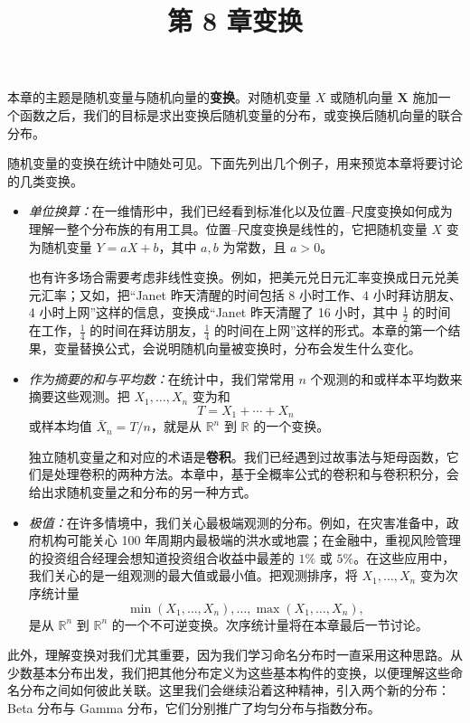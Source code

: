 \documentclass[UTF8,12pt,a4paper,fontset=fandol]{ctexart}
\title{第 8 章\quad 变换}
\author{}
\date{}
\begin{document}
\maketitle

本章的主题是随机变量与随机向量的\textbf{变换}。对随机变量 $X$ 或随机向量 $\mathbf X$ 施加一个函数之后，我们的目标是求出变换后随机变量的分布，或变换后随机向量的联合分布。

随机变量的变换在统计中随处可见。下面先列出几个例子，用来预览本章将要讨论的几类变换。

\begin{itemize}
  \item \textit{单位换算：}在一维情形中，我们已经看到标准化以及位置--尺度变换如何成为理解一整个分布族的有用工具。位置--尺度变换是线性的，它把随机变量 $X$ 变为随机变量 $Y=aX+b$，其中 $a,b$ 为常数，且 $a>0$。

  也有许多场合需要考虑非线性变换。例如，把美元兑日元汇率变换成日元兑美元汇率；又如，把“Janet 昨天清醒的时间包括 8 小时工作、4 小时拜访朋友、4 小时上网”这样的信息，变换成“Janet 昨天清醒了 16 小时，其中 $\frac12$ 的时间在工作，$\frac14$ 的时间在拜访朋友，$\frac14$ 的时间在上网”这样的形式。本章的第一个结果，变量替换公式，会说明随机向量被变换时，分布会发生什么变化。

  \item \textit{作为摘要的和与平均数：}在统计中，我们常常用 $n$ 个观测的和或样本平均数来摘要这些观测。把 $X_1,\ldots,X_n$ 变为和
  \[
    T=X_1+\cdots+X_n
  \]
  或样本均值 $\bar X_n=T/n$，就是从 $\mathbb R^n$ 到 $\mathbb R$ 的一个变换。

  独立随机变量之和对应的术语是\textbf{卷积}。我们已经遇到过故事法与矩母函数，它们是处理卷积的两种方法。本章中，基于全概率公式的卷积和与卷积积分，会给出求随机变量之和分布的另一种方式。

  \item \textit{极值：}在许多情境中，我们关心最极端观测的分布。例如，在灾害准备中，政府机构可能关心 100 年周期内最极端的洪水或地震；在金融中，重视风险管理的投资组合经理会想知道投资组合收益中最差的 $1\%$ 或 $5\%$。在这些应用中，我们关心的是一组观测的最大值或最小值。把观测排序，将 $X_1,\ldots,X_n$ 变为次序统计量
  \[
    \min(X_1,\ldots,X_n),\ldots,\max(X_1,\ldots,X_n),
  \]
  是从 $\mathbb R^n$ 到 $\mathbb R^n$ 的一个不可逆变换。次序统计量将在本章最后一节讨论。
\end{itemize}

此外，理解变换对我们尤其重要，因为我们学习命名分布时一直采用这种思路。从少数基本分布出发，我们把其他分布定义为这些基本构件的变换，以便理解这些命名分布之间如何彼此关联。这里我们会继续沿着这种精神，引入两个新的分布：Beta 分布与 Gamma 分布，它们分别推广了均匀分布与指数分布。
\end{document}

